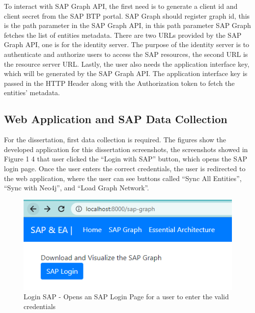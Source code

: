 \documentclass{article}
\begin{document}
To interact with SAP Graph API, the first need is to generate a client id and client secret from the SAP BTP portal. SAP Graph should register graph id, this is the path parameter in the SAP Graph API, in this path parameter SAP Graph fetches the list of entities metadata. There are two URLs provided by the SAP Graph API, one is for the identity server. The purpose of the identity server is to authenticate and authorize users to access the SAP resources, the second URL is the resource server URL. Lastly, the user also needs the application interface key, which will be generated by the SAP Graph API. The application interface key is passed in the HTTP Header along with the Authorization token to fetch the entities' metadata. 

\maketitle
\subsection{Web Application and SAP Data Collection}

For the dissertation, first data collection is required. The figures show the developed application for this dissertation screenshots, the screenshots showed in Figure 1 4  that user clicked the “Login with SAP” button, which opens the SAP login page. Once the user enters the correct credentials, the user is redirected to the web application, where the user can see buttons called “Sync All Entities”, “Sync with Neo4j”, and “Load Graph Network”.

\begin{figure}[ht!]
    \centering
    \includegraphics[scale=0.8]{sap-log-w}
    \caption{Login SAP - 
Opens an SAP Login Page for a user to enter the valid credentials
}
    \label{fig:sap-login}
\end{figure}
\end{document}
